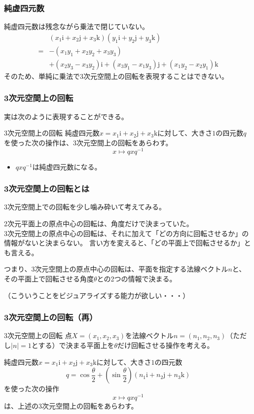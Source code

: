 \documentclass{beamer}
\newcommand{\ii}{\mathrm{i}}
\newcommand{\jj}{\mathrm{j}}
\newcommand{\kk}{\mathrm{k}}
\begin{document}
\begin{frame}
    \frametitle{純虚四元数}
    純虚四元数は残念ながら乗法で閉じていない。
    \begin{align*}
        &(x_1\ii+x_2\jj+x_3\kk)(y_1\ii+y_2\jj+y_3\kk)\\
        =&-(x_1y_1+x_2y_2+x_3y_3)\\
        &+(x_2y_3-x_3y_2)\ii+(x_3y_1-x_1y_3)\jj+(x_1y_2-x_2y_1)\kk
    \end{align*}
    そのため、単純に乗法で3次元空間上の回転を表現することはできない。
\end{frame}

\begin{frame}
    \frametitle{3次元空間上の回転}
    実は次のように表現することができる。
    \begin{block}{3次元空間上の回転}
        純虚四元数\(x=x_1\ii+x_2\jj+x_3\kk\)に対して、大きさ\(1\)の四元数\(q\)を使った次の操作は、3次元空間上の回転をあらわす。
        \[
            x\mapsto qxq^{-1}
        \]
    \end{block}
    \begin{itemize}
        \item \(qxq^{-1}\)は純虚四元数になる。
    \end{itemize}
\end{frame}

\begin{frame}
    \frametitle{3次元空間上の回転とは}
    3次元空間上での回転を少し噛み砕いて考えてみる。

    \bigskip
    2次元平面上の原点中心の回転は、角度だけで決まっていた。\\
    3次元空間上の原点中心の回転は、それに加えて「どの方向に回転させるか」の情報がないと決まらない。
    言い方を変えると、「どの平面上で回転させるか」とも言える。
    
    \bigskip
    つまり、3次元空間上の原点中心の回転は、平面を指定する法線ベクトル\(n\)と、
    その平面上で回転させる角度\(\theta\)との2つの情報で決まる。

    \bigskip
    （こういうことをビジュアライズする能力が欲しい・・・）
\end{frame}

\begin{frame}
    \frametitle{3次元空間上の回転（再）}
    \begin{block}{3次元空間上の回転}
        点\(X=(x_1,x_2,x_3)\)を法線ベクトル\(n=(n_1,n_2,n_3)\)（ただし\(|n|=1\)とする）で決まる平面上を\(\theta\)だけ回転させる操作を考える。

        \bigskip
        純虚四元数\(x=x_1\ii+x_2\jj+x_3\kk\)に対して、大きさ\(1\)の四元数
        \[
            q=\cos\frac{\theta}{2}+\left(\sin\frac{\theta}{2}\right)(n_1\ii+n_2\jj+n_3\kk)
        \]
        を使った次の操作
        \[
            x\mapsto qxq^{-1}
        \]
        は、上述の3次元空間上の回転をあらわす。
    \end{block}
\end{frame}
\end{document}
